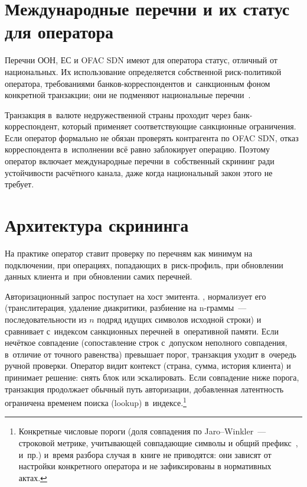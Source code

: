 \section{Международные перечни и их статус для
оператора}\label{sec:sanctions-international}

Перечни ООН, ЕС и OFAC SDN имеют для оператора статус,
отличный от национальных. Их использование определяется собственной
риск-политикой оператора, требованиями банков-корреспондентов
и~санкционным фоном конкретной транзакции; они не подменяют
национальные
перечни~\cite{ofac-sanctions-list-service,eu-sanctions-info,unsc-consolidated-list}.

Транзакция в~валюте недружественной страны проходит
через банк-корреспондент, который применяет соответствующие
санкционные ограничения. Если оператор формально не обязан
проверять контрагента по OFAC SDN, отказ корреспондента
в~исполнении всё равно заблокирует операцию.
Поэтому оператор включает международные перечни в~собственный
скрининг ради устойчивости расчётного канала, даже когда
национальный закон этого не требует.

\section{Архитектура скрининга}\label{sec:sanctions-screening-flow}

На практике оператор ставит проверку по перечням как минимум
на подключении, при операциях, попадающих в~риск-профиль,
при обновлении данных клиента и~при обновлении самих перечней.

Авторизационный запрос поступает на хост эмитента. ,
нормализует его
(транслитерация, удаление диакритики, разбиение на n-граммы~---
последовательности из $n$ подряд идущих символов исходной строки)
и сравнивает с~индексом санкционных перечней в~оперативной
памяти. Если нечёткое совпадение (сопоставление строк с~допуском
неполного совпадения, в~отличие от точного равенства) превышает
порог, транзакция уходит в~очередь ручной проверки. Оператор
видит контекст (страна, сумма, история клиента) и принимает
решение: снять блок или эскалировать. Если совпадение ниже
порога, транзакция продолжает обычный путь авторизации,
добавленная латентность ограничена временем поиска (lookup)
в~индексе.\footnote{Конкретные числовые пороги (доля совпадения
по Jaro--Winkler~--- строковой метрике, учитывающей совпадающие
символы и общий префикс~\cite{winkler-1990}, и~пр.)
и~время разбора случая в~книге не приводятся: они зависят
от настройки конкретного оператора и не зафиксированы в
нормативных актах.}


